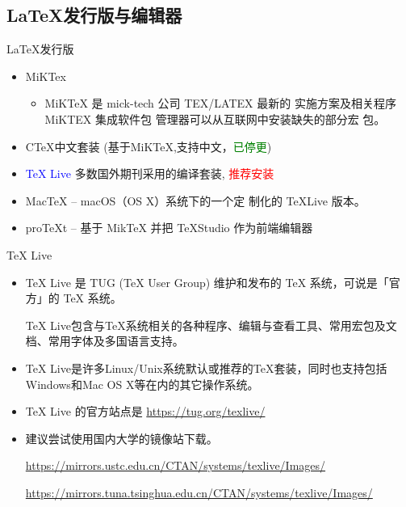 \documentclass[13pt]{ctexbeamer}
\newcommand{\red}[1]{\textcolor{red}{#1}}
\newcommand{\blue}[1]{\textcolor{blue}{#1}}
\newcommand{\green}[1]{\textcolor{green}{#1}}
\begin{document}
\subsection{LaTeX发行版与编辑器}
\begin{frame}{LaTeX发行版}
\begin{itemize}
	\item MiKTex 
		\begin{itemize}
	\item
	MiKTeX 是 mick-tech 公司 TEX/LATEX 最新的
实施方案及相关程序 MiKTEX 集成软件包
管理器可以从互联网中安装缺失的部分宏
包。
\end{itemize}
	\item CTeX中文套装 (基于MiKTeX,支持中文，\green{已停更})
	
	\item \blue{TeX Live}   多数国外期刊采用的编译套装, \red{推荐安装} 


	\item MacTeX -- macOS（OS X）系统下的一个定
制化的 TeXLive 版本。

\item proTeXt -- 基于 MikTeX 并把 TeXStudio 作为前端编辑器
\end{itemize}
\end{frame}


\begin{frame}{TeX Live}
	\begin{itemize}
		\item TeX Live 是 TUG (TeX User Group) 维护和发布的 TeX 系统，可说是「官方」的 TeX 系统。
	
	TeX Live包含与TeX系统相关的各种程序、编辑与查看工具、常用宏包及文档、常用字体及多国语言支持。
	\item
	TeX Live是许多Linux/Unix系统默认或推荐的TeX套装，同时也支持包括Windows和Mac OS X等在内的其它操作系统。
\end{itemize}
\begin{itemize}

	\item TeX Live 的官方站点是 \href{https://tug.org/texlive/}{https://tug.org/texlive/}
	\item 建议尝试使用国内大学的镜像站下载。
	
	\href{https://mirrors.ustc.edu.cn/CTAN/systems/texlive/Images/} {https://mirrors.ustc.edu.cn/CTAN/systems/texlive/Images/}
	
	
	\href{https://mirrors.tuna.tsinghua.edu.cn/CTAN/systems/texlive/Images/}{https://mirrors.tuna.tsinghua.edu.cn/CTAN/systems/texlive/Images/}
	
\end{itemize}
\end{frame} 
\end{document}
